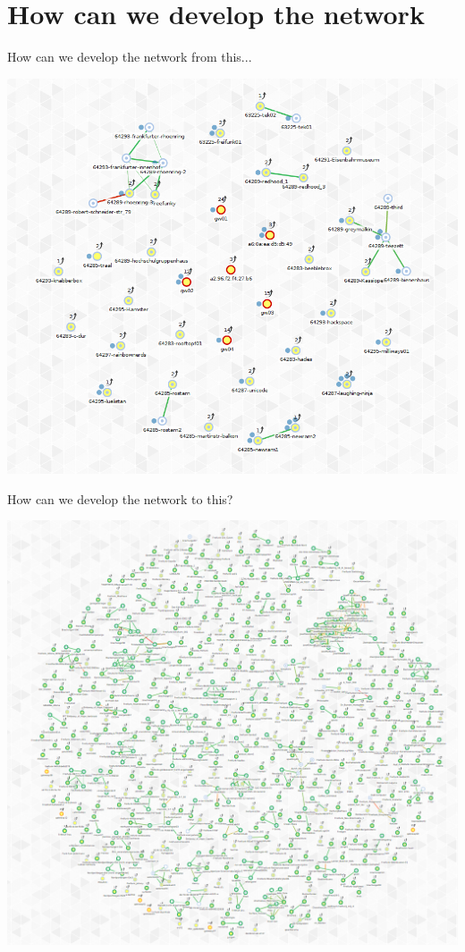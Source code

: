 \documentclass{beamer}
\begin{document}
\section{How can we develop the network}
\begin{frame}{How can we develop the network}
\vfill
from this...\\
\begin{center}
\includegraphics[height=0.8\textheight]{darmstadt-graph}
\end{center}
\end{frame}

\begin{frame}{How can we develop the network}
\vfill
to this?\\
\begin{center}
\includegraphics[height=0.8\textheight]{hamburg-graph}
\end{center}
\end{frame}
\end{document}
